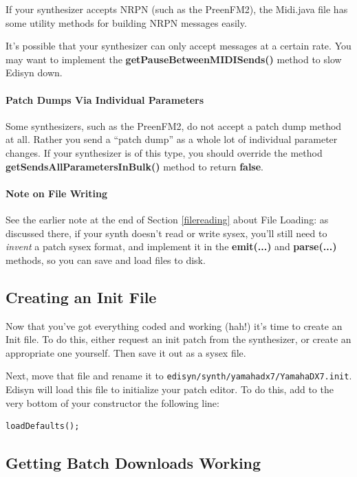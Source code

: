 \documentclass{article}
\begin{document}
If your synthesizer accepts NRPN (such as the PreenFM2), the Midi.java file has some utility methods for building NRPN messages easily.

It's possible that your synthesizer can only accept messages at a certain rate.  You may want to implement the {\bf getPauseBetweenMIDISends()} method to slow Edisyn down.

\paragraph{Patch Dumps Via Individual Parameters}

Some synthesizers, such as the PreenFM2, do not accept a patch dump method at all.  Rather you send a ``patch dump'' as a whole lot of individual parameter changes.  If your synthesizer is of this type, you should override the method {\bf getSendsAllParametersInBulk()} method to return {\bf false}.

\paragraph{Note on File Writing}

See the earlier note at the end of Section \ref{filereading} about File Loading: as discussed there, if your synth doesn't read or write sysex, you'll still need to {\it invent} a patch sysex format, and implement it in the {\bf emit(...)} and {\bf parse(...)} methods, so you can save and load files to disk.


\subsection{Creating an Init File}

Now that you've got everything coded and working (hah!) it's time to create an Init file.  To do this, either request an init patch from the synthesizer, or create an appropriate one yourself.  Then save it out as a sysex file.

Next, move that file and rename it to {\tt edisyn/synth/yamahadx7/YamahaDX7.init}.  Edisyn will load this file to initialize your patch editor.  To do this, add to the very bottom of your constructor the following line:

\begin{verbatim}
loadDefaults();
\end{verbatim}

\subsection{Getting Batch Downloads Working}
\end{document}
